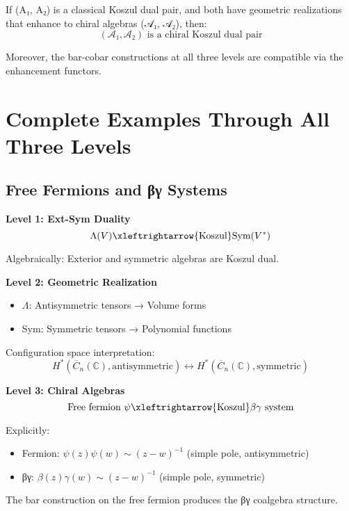 \begin{theorem}\label{thm:enhancement-preserves}
If (A₁, A₂) is a classical Koszul dual pair, and both have geometric realizations that enhance to chiral algebras (𝒜₁, 𝒜₂), then:
$$(𝒜₁, 𝒜₂) \text{ is a chiral Koszul dual pair}$$

Moreover, the bar-cobar constructions at all three levels are compatible via the enhancement functors.
\end{theorem}

\section{Complete Examples Through All Three Levels}

\subsection{Free Fermions and βγ Systems}

\begin{example}\label{ex:fermion-boson-three-levels}

\textbf{Level 1: Ext-Sym Duality}
$$\Lambda(V) \xleftrightarrow{\text{Koszul}} \text{Sym}(V^*)$$

Algebraically: Exterior and symmetric algebras are Koszul dual.

\textbf{Level 2: Geometric Realization}
\begin{itemize}
\item $\Lambda$: Antisymmetric tensors → Volume forms
\item Sym: Symmetric tensors → Polynomial functions
\end{itemize}

Configuration space interpretation:
$$H^*(\overline{C}_n(\mathbb{C}), \text{antisymmetric}) \leftrightarrow H^*(\overline{C}_n(\mathbb{C}), \text{symmetric})$$

\textbf{Level 3: Chiral Algebras}
$$\text{Free fermion } \psi \xleftrightarrow{\text{Koszul}} \beta\gamma \text{ system}$$

Explicitly:
\begin{itemize}
\item Fermion: $\psi(z)\psi(w) \sim (z-w)^{-1}$ (simple pole, antisymmetric)
\item βγ: $\beta(z)\gamma(w) \sim (z-w)^{-1}$ (simple pole, symmetric)
\end{itemize}

The bar construction on the free fermion produces the βγ coalgebra structure.
\end{example}

